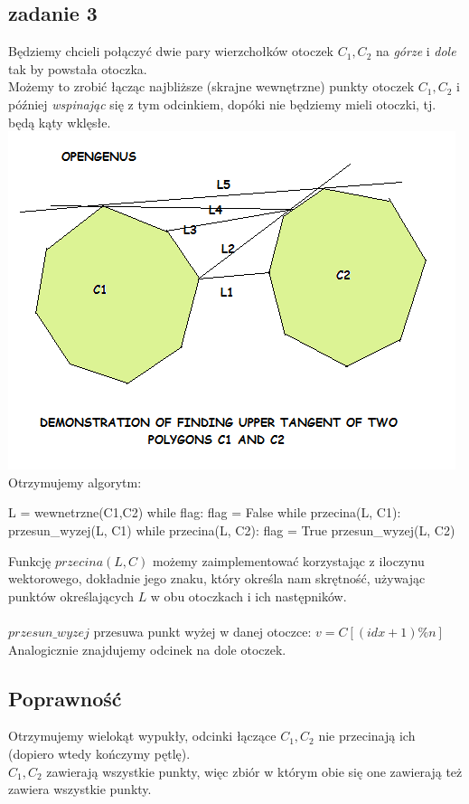 \documentclass{article}
\begin{document}
\subsection*{zadanie 3}
Będziemy chcieli połączyć dwie pary wierzchołków otoczek $C_1, C_2$ na \textit{górze} i \textit{dole} tak by powstała otoczka.\\
Możemy to zrobić łącząc najbliższe (skrajne wewnętrzne) punkty otoczek $C_1,C_2$ i później \textit{wspinając} się z tym odcinkiem, dopóki nie będziemy mieli otoczki, tj. będą kąty wklęsłe.\\
\includegraphics[scale=0.6]{convex_tangent}\\
Otrzymujemy algorytm:
\begin{python}
L = wewnetrzne(C1,C2)
while flag:
    flag = False
    while przecina(L, C1):
        przesun_wyzej(L, C1)
    while przecina(L, C2):
        flag = True
        przesun_wyzej(L, C2)
\end{python}
Funkcję $przecina(L,C)$ możemy zaimplementować korzystając z iloczynu wektorowego, dokładnie jego znaku, który określa nam skrętność, używając punktów określających $L$ w obu otoczkach i ich następników.\\\\
$przesun\_wyzej$ przesuwa punkt wyżej w danej otoczce: $v = C[(idx+1)\%n]$\\
Analogicznie znajdujemy odcinek na dole otoczek.\\
\subsection*{Poprawność}
Otrzymujemy wielokąt wypukły, odcinki łączące $C_1, C_2$ nie przecinają ich (dopiero wtedy kończymy pętlę).\\
$C_1, C_2$ zawierają wszystkie punkty, więc zbiór w którym obie się one zawierają też zawiera wszystkie punkty.\\
\clearpage
\end{document}
